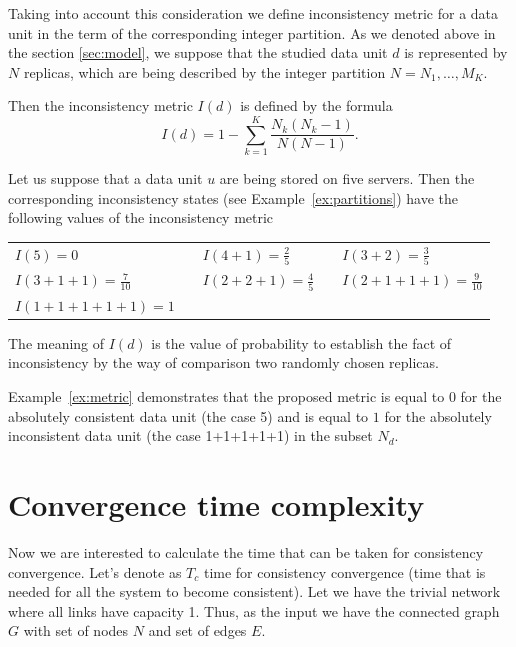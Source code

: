 \documentclass{llncs}
\begin{document}
Taking into account this consideration we define inconsistency metric for a data unit in the term of the corresponding integer partition.
As we denoted above  in the section \ref{sec:model}, we suppose that the studied data unit $d$ is represented by $N$ replicas, which are being described by the integer partition $N=N_1,\ldots,M_K$.

Then the inconsistency metric $I(d)$ is defined by the formula
\begin{equation}\label{eq:metric}
	I(d)=1-\sum_{k=1}^K\dfrac{N_k(N_k-1)}{N(N-1)}.
\end{equation}

\begin{example}\label{ex:metric}
Let us suppose that a data unit $u$ are being stored on five servers.
Then the corresponding inconsistency states (see Example~\ref{ex:partitions}) have the following values of the inconsistency metric
\begin{center}
\begin{tabular}{lclcl}
	$I(5)=0$ & & $I(4+1)=\frac{2}{5}$ & & $I(3+2)=\frac{3}{5}$\\
	$I(3+1+1)=\frac{7}{10}$ &\hspace*{10pt}& $I(2+2+1)=\frac{4}{5}$
		&\hspace*{10pt}& $I(2+1+1+1)=\frac{9}{10}$\\
	$I(1+1+1+1+1)=1$
\end{tabular}
\end{center}
The meaning of $I(d)$ is the value of probability to establish the fact of inconsistency by the way of comparison two randomly chosen replicas.
\end{example}
Example~\ref{ex:metric} demonstrates that the proposed metric is equal to $0$ for the absolutely consistent data unit (the case 5) and is equal to $1$ for the absolutely inconsistent data unit (the case 1+1+1+1+1) in the subset $N_d$.


\section{Convergence time complexity}\label{sec:complexity}


Now we are interested to calculate the time that can be taken for consistency convergence.
Let's denote as $T_c$ time for consistency convergence (time that is needed for all the system to become consistent).
Let we have the trivial network where all links have capacity 1. Thus, as the input we have the connected graph
$G$ with set of nodes $N$ and set of edges $E$.
\end{document}
